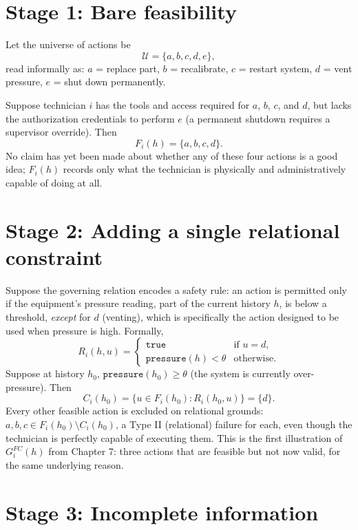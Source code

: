 \documentclass[11pt]{report}
\theoremstyle{definition}
\theoremstyle{plain}
\newcommand{\Uni}{\mathcal{U}}
\begin{document}
\section*{Stage 1: Bare feasibility}

Let the universe of actions be
\[
\Uni = \{a, b, c, d, e\},
\]
read informally as: $a$ = replace part, $b$ = recalibrate, $c$ = restart system, $d$ = vent pressure, $e$ = shut down permanently.

Suppose technician $i$ has the tools and access required for $a$, $b$, $c$, and $d$, but lacks the authorization credentials to perform $e$ (a permanent shutdown requires a supervisor override). Then
\[
F_i(h) = \{a,b,c,d\}.
\]
No claim has yet been made about whether any of these four actions is a good idea; $F_i(h)$ records only what the technician is physically and administratively capable of doing at all.

\section*{Stage 2: Adding a single relational constraint}

Suppose the governing relation encodes a safety rule: an action is permitted only if the equipment's pressure reading, part of the current history $h$, is below a threshold, \emph{except} for $d$ (venting), which is specifically the action designed to be used when pressure is high. Formally,
\[
R_i(h,u) = \begin{cases} \texttt{true} & \text{if } u = d, \\ \texttt{pressure}(h) < \theta & \text{otherwise.} \end{cases}
\]
Suppose at history $h_0$, $\texttt{pressure}(h_0) \geq \theta$ (the system is currently over-pressure). Then
\[
C_i(h_0) = \{u \in F_i(h_0) : R_i(h_0,u)\} = \{d\}.
\]
Every other feasible action is excluded on relational grounds: $a,b,c \in F_i(h_0) \setminus C_i(h_0)$, a Type II (relational) failure for each, even though the technician is perfectly capable of executing them. This is the first illustration of $G^{FC}_i(h)$ from Chapter 7: three actions that are feasible but not now valid, for the same underlying reason.

\section*{Stage 3: Incomplete information}
\end{document}
